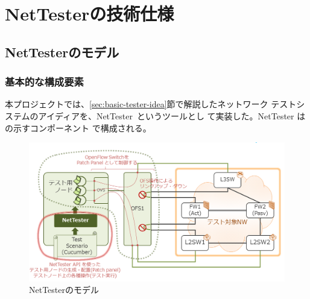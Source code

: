 
\chapter{NetTesterの技術仕様}
\label{chap:nettester-design}

 \section{NetTesterのモデル}
 \label{sec:nettester-model}

 \subsection{基本的な構成要素}

本プロジェクトでは、\ref{sec:basic-tester-idea}節で解説したネットワーク
テストシステムのアイディアを、NetTester~\cite{nettester}というツールとし
て実装した。NetTester はの示すコンポーネント
で構成される。

\begin{figure}[h]
 \centering
 \includegraphics[scale=0.6]{img/model-nettester.png}
 \caption{NetTesterのモデル}
 \label{fig:model-nettester}
\end{figure}

